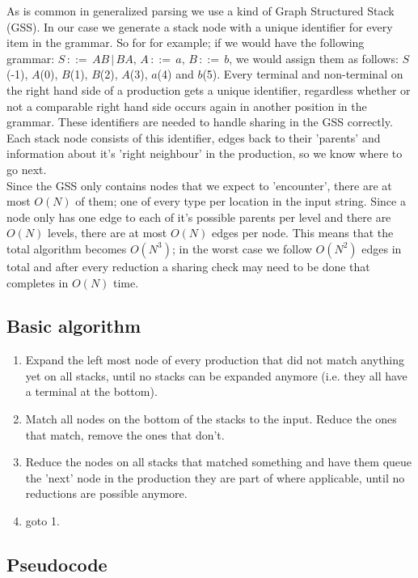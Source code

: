 \documentclass[a4paper,10pt]{article}
\begin{document}
As is common in generalized parsing we use a kind of Graph Structured Stack (GSS). In our case we generate a stack node with a unique identifier for every item in the grammar. So for for example; if we would have the following grammar: $S\,::=\,AB\,|\,BA,\,A\,::=\,a,\,B\,::=\,b$, we would assign them as follows: $S$(-1), $A$(0), $B$(1), $B$(2), $A$(3), $a$(4) and $b$(5). Every terminal and non-terminal on the right hand side of a production gets a unique identifier, regardless whether or not a comparable right hand side occurs again in another position in the grammar. These identifiers are needed to handle sharing in the GSS correctly. Each stack node consists of this identifier, edges back to their 'parents' and information about it's 'right neighbour' in the production, so we know where to go next.\\
Since the GSS only contains nodes that we expect to 'encounter', there are at most $O(N)$ of them; one of every type per location in the input string. Since a node only has one edge to each of it's possible parents per level and there are $O(N)$ levels, there are at most $O(N)$ edges per node. This means that the total algorithm becomes $O(N^3)$; in the worst case we follow $O(N^2)$ edges in total and after every reduction a sharing check may need to be done that completes in $O(N)$ time.

\subsection{Basic algorithm}

\begin{enumerate}
 \setlength{\itemsep}{0pt}
 \setlength{\parskip}{0pt}
 \setlength{\parsep}{0pt}

 \item Expand the left most node of every production that did not match anything yet on all stacks, until no stacks can be expanded anymore (i.e. they all have a terminal at the bottom).
 \item Match all nodes on the bottom of the stacks to the input. Reduce the ones that match, remove the ones that don't.
 \item Reduce the nodes on all stacks that matched something and have them queue the 'next' node in the production they are part of where applicable, until no reductions are possible anymore.
 \item goto 1.
\end{enumerate}

\subsection{Pseudocode}
\end{document}

